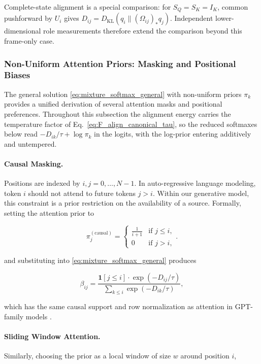 \documentclass[twoside,11pt]{article}
\begin{document}
Complete-state alignment is a special comparison: for $S_Q=S_K=I_K$, common pushforward by $U_i$ gives
$D_{ij}=D_{\mathrm{KL}}(q_i\|(\Omega_{ij})_*q_j)$.
Independent lower-dimensional role measurements therefore extend the comparison beyond this frame-only case.
\subsubsection{Non-Uniform Attention Priors: Masking and Positional Biases}
\label{sec:nonuniform_priors}

The general solution \eqref{eq:mixture_softmax_general} with non-uniform priors $\pi_k$ provides a unified derivation of several attention masks and positional preferences. Throughout this subsection the alignment energy carries the temperature factor of Eq.~\eqref{eq:F_align_canonical_tau}, so the reduced softmaxes below read $-D_{ik}/\tau + \log\pi_k$ in the logits, with the log-prior entering additively and untempered.

\paragraph{Causal Masking.} Positions are indexed by $i,j=0,\ldots,N-1$.
In auto-regressive language modeling, token $i$ should not attend to future tokens $j > i$. Within our generative model, this constraint is a prior restriction on the availability of a source. Formally, setting the attention prior to

\begin{equation}
\pi_j^{(\text{causal})} = \begin{cases} \frac{1}{i+1} & \text{if } j \leq i, \\ 0 & \text{if } j > i, \end{cases}
\label{eq:causal_prior}
.
\end{equation}

and substituting into \eqref{eq:mixture_softmax_general} produces

\begin{equation}
\beta_{ij} = \frac{\mathbf{1}[j \leq i] \cdot \exp(-D_{ij}/\tau)}{\sum_{k \leq i} \exp(-D_{ik}/\tau)},
\label{eq:causal_attention}
\end{equation}

which has the same causal support and row normalization as attention in GPT-family models \citep{radford2019language}. 

\paragraph{Sliding Window Attention.}
Similarly, choosing the prior as a local window of size $w$ around position $i$,
\end{document}
